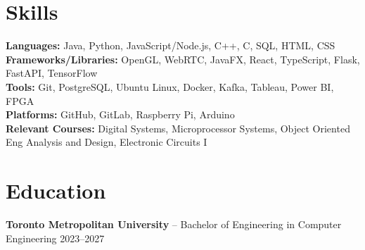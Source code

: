 \documentclass[11pt]{article}
\begin{document}
\section*{Skills}
\textbf{Languages:} Java, Python, JavaScript/Node.js, C++, C, SQL, HTML, CSS \\
\textbf{Frameworks/Libraries:} OpenGL, WebRTC, JavaFX, React, TypeScript, Flask, FastAPI, TensorFlow \\
\textbf{Tools:} Git, PostgreSQL, Ubuntu Linux, Docker, Kafka, Tableau, Power BI, FPGA \\
\textbf{Platforms:} GitHub, GitLab, Raspberry Pi, Arduino \\
\textbf{Relevant Courses:} Digital Systems, Microprocessor Systems, Object Oriented Eng Analysis and Design, Electronic Circuits I

\section*{Education}
\textbf{Toronto Metropolitan University} -- Bachelor of Engineering in Computer Engineering \hfill 2023--2027
\end{document}
